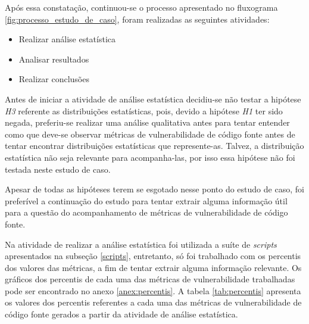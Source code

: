 Após essa constatação, continuou-se o processo apresentado no fluxograma 
\ref{fig:processo_estudo_de_caso}, foram realizadas as seguintes atividades:

\begin{itemize}
  \item Realizar análise estatística
  \item Analisar resultados
  \item Realizar conclusões
\end{itemize}

Antes de iniciar a atividade de análise estatística decidiu-se não testar a
hipótese \emph{H3} referente as distribuições estatísticas, pois, devido a
hipótese \emph{H1} ter sido negada, preferiu-se realizar uma análise qualitativa
antes para tentar entender como que deve-se observar métricas de vulnerabilidade de código
fonte antes de tentar encontrar distribuições estatísticas que represente-as.
Talvez, a distribuição estatística não seja relevante para acompanha-las, por
isso essa hipótese não foi testada neste estudo de caso.

Apesar de todas as hipóteses terem se esgotado nesse ponto do estudo de caso,
foi preferível a continuação do estudo para tentar extrair alguma informação
útil para a questão do acompanhamento de métricas de vulnerabilidade de código
fonte.

Na atividade de realizar a análise estatística foi utilizada a suíte de
\textit{scripts} apresentados na subseção \ref{scripts}, entretanto, só foi
trabalhado com os percentis dos valores das métricas, a fim de tentar extrair
alguma informação relevante. Os gráficos dos percentis de cada uma das métricas 
de vulnerabilidade trabalhadas pode ser encontrado no anexo \ref{anex:percentis}. 
A tabela \ref{tab:percentis} apresenta os valores dos percentis referentes a cada
uma das métricas de vulnerabilidade de código fonte gerados a partir da atividade
de análise estatística.

